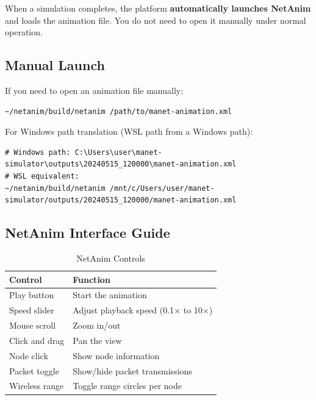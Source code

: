 \documentclass[12pt,a4paper]{article}
\begin{document}
When a simulation completes, the platform \textbf{automatically launches NetAnim} and loads the animation file. You do not need to open it manually under normal operation.

\subsection{Manual Launch}

If you need to open an animation file manually:

\begin{lstlisting}[style=bash, caption={Manually open NetAnim with an animation file}]
~/netanim/build/netanim /path/to/manet-animation.xml
\end{lstlisting}

For Windows path translation (WSL path from a Windows path):
\begin{lstlisting}[style=bash, caption={Path translation example}]
# Windows path: C:\Users\user\manet-simulator\outputs\20240515_120000\manet-animation.xml
# WSL equivalent:
~/netanim/build/netanim /mnt/c/Users/user/manet-simulator/outputs/20240515_120000/manet-animation.xml
\end{lstlisting}

\subsection{NetAnim Interface Guide}

\begin{table}[H]
\centering
\caption{NetAnim Controls}
\begin{tabular}{ll}
\toprule
\textbf{Control}          & \textbf{Function} \\
\midrule
Play button               & Start the animation \\
Speed slider              & Adjust playback speed (0.1$\times$ to 10$\times$) \\
Mouse scroll              & Zoom in/out \\
Click and drag            & Pan the view \\
Node click                & Show node information \\
Packet toggle             & Show/hide packet transmissions \\
Wireless range            & Toggle range circles per node \\
\bottomrule
\end{tabular}
\end{table}
\end{document}
